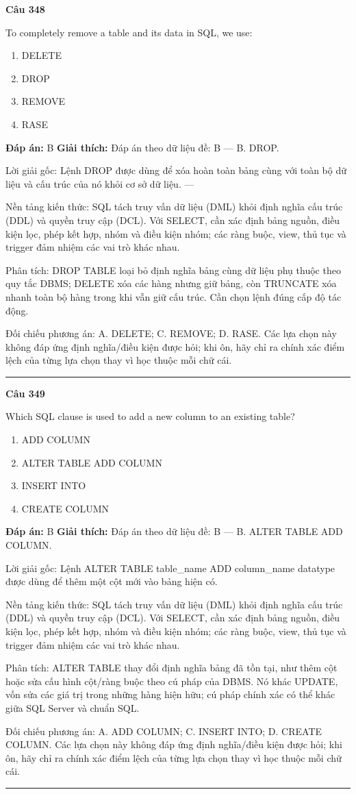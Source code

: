 \documentclass[11pt,a4paper]{article}
\newenvironment{question}[1]{%
  \par\vspace{1em}\noindent\textbf{\large Câu #1}\par\vspace{0.4em}
}{%
  \par\vspace{1em}\hrule\vspace{0.6em}
}
\newenvironment{choices}{%
  \begin{enumerate}[label=\textbf{\Alph*.},leftmargin=2.2em,itemsep=2pt,topsep=3pt]
}{%
  \end{enumerate}
}
\newcommand{\choice}{\item}
\begin{document}
\begin{question}{348}
To completely remove a table and its data in SQL, we use:
\begin{choices}
\choice DELETE
\choice DROP
\choice REMOVE
\choice RASE
\end{choices}
\textbf{Đáp án:} B
\textbf{Giải thích:} Đáp án theo dữ liệu đề: B — B. DROP.

Lời giải gốc: Lệnh DROP được dùng để xóa hoàn toàn bảng cùng với toàn bộ dữ liệu và cấu trúc của nó khỏi cơ sở dữ liệu. ---

Nền tảng kiến thức: SQL tách truy vấn dữ liệu (DML) khỏi định nghĩa cấu trúc (DDL) và quyền truy cập (DCL). Với SELECT, cần xác định bảng nguồn, điều kiện lọc, phép kết hợp, nhóm và điều kiện nhóm; các ràng buộc, view, thủ tục và trigger đảm nhiệm các vai trò khác nhau.

Phân tích: DROP TABLE loại bỏ định nghĩa bảng cùng dữ liệu phụ thuộc theo quy tắc DBMS; DELETE xóa các hàng nhưng giữ bảng, còn TRUNCATE xóa nhanh toàn bộ hàng trong khi vẫn giữ cấu trúc. Cần chọn lệnh đúng cấp độ tác động.

Đối chiếu phương án: A. DELETE; C. REMOVE; D. RASE. Các lựa chọn này không đáp ứng định nghĩa/điều kiện được hỏi; khi ôn, hãy chỉ ra chính xác điểm lệch của từng lựa chọn thay vì học thuộc mỗi chữ cái.
\end{question}

\begin{question}{349}
Which SQL clause is used to add a new column to an existing table?
\begin{choices}
\choice ADD COLUMN
\choice ALTER TABLE ADD COLUMN
\choice INSERT INTO
\choice CREATE COLUMN
\end{choices}
\textbf{Đáp án:} B
\textbf{Giải thích:} Đáp án theo dữ liệu đề: B — B. ALTER TABLE ADD COLUMN.

Lời giải gốc: Lệnh ALTER TABLE table_name ADD column_name datatype được dùng để thêm một cột mới vào bảng hiện có.

Nền tảng kiến thức: SQL tách truy vấn dữ liệu (DML) khỏi định nghĩa cấu trúc (DDL) và quyền truy cập (DCL). Với SELECT, cần xác định bảng nguồn, điều kiện lọc, phép kết hợp, nhóm và điều kiện nhóm; các ràng buộc, view, thủ tục và trigger đảm nhiệm các vai trò khác nhau.

Phân tích: ALTER TABLE thay đổi định nghĩa bảng đã tồn tại, như thêm cột hoặc sửa cấu hình cột/ràng buộc theo cú pháp của DBMS. Nó khác UPDATE, vốn sửa các giá trị trong những hàng hiện hữu; cú pháp chính xác có thể khác giữa SQL Server và chuẩn SQL.

Đối chiếu phương án: A. ADD COLUMN; C. INSERT INTO; D. CREATE COLUMN. Các lựa chọn này không đáp ứng định nghĩa/điều kiện được hỏi; khi ôn, hãy chỉ ra chính xác điểm lệch của từng lựa chọn thay vì học thuộc mỗi chữ cái.
\end{question}
\end{document}
